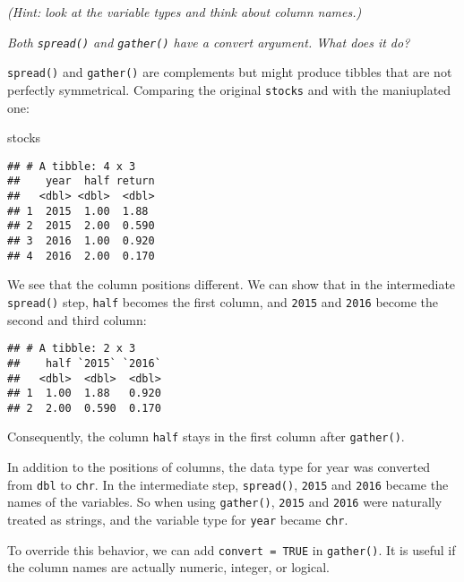 \documentclass[]{article}
\newenvironment{Shaded}{\begin{snugshade}}{\end{snugshade}}
\newcommand{\KeywordTok}[1]{\textcolor[rgb]{0.13,0.29,0.53}{\textbf{#1}}}
\newcommand{\StringTok}[1]{\textcolor[rgb]{0.31,0.60,0.02}{#1}}
\newcommand{\OperatorTok}[1]{\textcolor[rgb]{0.81,0.36,0.00}{\textbf{#1}}}
\newcommand{\NormalTok}[1]{#1}
\theoremstyle{definition}
\theoremstyle{definition}
\theoremstyle{definition}
\theoremstyle{remark}
\begin{document}
\emph{(Hint: look at the variable types and think about column names.)}

\emph{Both \texttt{spread()} and \texttt{gather()} have a convert
argument. What does it do?}

\texttt{spread()} and \texttt{gather()} are complements but might
produce tibbles that are not perfectly symmetrical. Comparing the
original \texttt{stocks} and with the maniuplated one:

\begin{Shaded}
\begin{Highlighting}[]
\NormalTok{stocks}
\end{Highlighting}
\end{Shaded}

\begin{verbatim}
## # A tibble: 4 x 3
##    year  half return
##   <dbl> <dbl>  <dbl>
## 1  2015  1.00  1.88 
## 2  2015  2.00  0.590
## 3  2016  1.00  0.920
## 4  2016  2.00  0.170
\end{verbatim}

We see that the column positions different. We can show that in the
intermediate \texttt{spread()} step, \texttt{half} becomes the first
column, and \texttt{2015} and \texttt{2016} become the second and third
column:

\begin{Shaded}
\end{Shaded}

\begin{verbatim}
## # A tibble: 2 x 3
##    half `2015` `2016`
##   <dbl>  <dbl>  <dbl>
## 1  1.00  1.88   0.920
## 2  2.00  0.590  0.170
\end{verbatim}

Consequently, the column \texttt{half} stays in the first column after
\texttt{gather()}.

In addition to the positions of columns, the data type for year was
converted from \texttt{dbl} to \texttt{chr}. In the intermediate step,
\texttt{spread()}, \texttt{2015} and \texttt{2016} became the names of
the variables. So when using \texttt{gather()}, \texttt{2015} and
\texttt{2016} were naturally treated as strings, and the variable type
for \texttt{year} became \texttt{chr}.

To override this behavior, we can add \texttt{convert\ =\ TRUE} in
\texttt{gather()}. It is useful if the column names are actually
numeric, integer, or logical.
\end{document}
